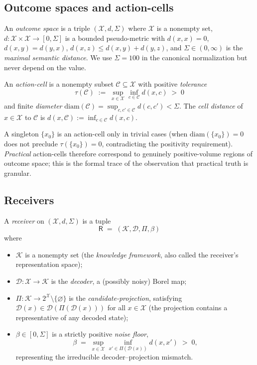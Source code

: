 \documentclass[twocolumn,11pt,a4paper]{article}
\newcommand{\K}{\mathcal{K}}
\newcommand{\D}{\mathcal{D}}
\newcommand{\X}{\mathcal{X}}
\newcommand{\Cell}{\mathcal{C}}
\newcommand{\receiver}{\mathsf{R}}
\newcommand{\diam}{\mathrm{diam}}
\begin{document}
\subsection{Outcome spaces and action-cells}

\begin{definition}\label{def:outcome}
An \emph{outcome space} is a triple $(\X,d,\Sigma)$ where $\X$ is a nonempty
set, $d:\X\times\X\to[0,\Sigma]$ is a bounded pseudo-metric with
$d(x,x)=0$, $d(x,y)=d(y,x)$, $d(x,z)\le d(x,y)+d(y,z)$, and
$\Sigma\in(0,\infty)$ is the \emph{maximal semantic distance}. We use
$\Sigma=100$ in the canonical normalization but never depend on the value.
\end{definition}

\begin{definition}\label{def:cell}
An \emph{action-cell} is a nonempty subset $\Cell\subseteq\X$ with positive
\emph{tolerance}
\[
\tau(\Cell)\;:=\;\sup_{x\in\X}\inf_{c\in\Cell}d(x,c)\;>\;0
\]
and finite \emph{diameter} $\diam(\Cell)=\sup_{c,c'\in\Cell}d(c,c')<\Sigma$.
The \emph{cell distance} of $x\in\X$ to $\Cell$ is
$d(x,\Cell):=\inf_{c\in\Cell}d(x,c)$.
\end{definition}

\begin{remark}\label{rem:point-vs-cell}
A singleton $\{x_0\}$ is an action-cell only in trivial cases (when
$\diam(\{x_0\})=0$ does not preclude $\tau(\{x_0\})=0$, contradicting the
positivity requirement). \emph{Practical} action-cells therefore correspond
to genuinely positive-volume regions of outcome space; this is the formal
trace of the observation that practical truth is granular.
\end{remark}

\subsection{Receivers}

\begin{definition}[Receiver]\label{def:receiver}
A \emph{receiver} on $(\X,d,\Sigma)$ is a tuple
\[
\receiver \;=\; (\K,\D,\Pi,\beta)
\]
where
\begin{itemize}[leftmargin=*]
\item $\K$ is a nonempty set (the \emph{knowledge framework}, also called
the receiver's representation space);
\item $\D:\X\to\K$ is the \emph{decoder}, a (possibly noisy) Borel map;
\item $\Pi:\K\to 2^\X\setminus\{\varnothing\}$ is the
\emph{candidate-projection}, satisfying $\D(x)\in\D(\Pi(\D(x)))$ for all
$x\in\X$ (the projection contains a representative of any decoded state);
\item $\beta\in[0,\Sigma]$ is a strictly positive \emph{noise floor},
\[
\beta\;=\;\sup_{x\in\X}\inf_{x'\in\Pi(\D(x))}d(x,x')\;>\;0,
\]
representing the irreducible decoder--projection mismatch.
\end{itemize}
\end{definition}
\end{document}
